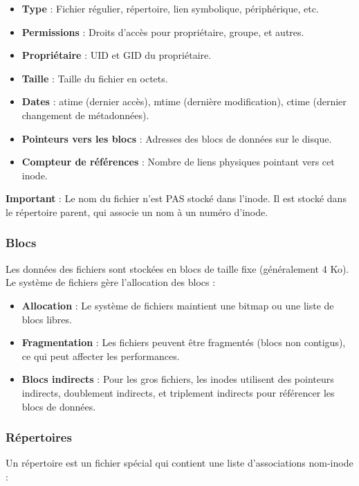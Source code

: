 \documentclass[12pt,a4paper]{article}
\begin{document}
\begin{itemize}
    \item \textbf{Type} : Fichier régulier, répertoire, lien symbolique, périphérique, etc.
    \item \textbf{Permissions} : Droits d'accès pour propriétaire, groupe, et autres.
    \item \textbf{Propriétaire} : UID et GID du propriétaire.
    \item \textbf{Taille} : Taille du fichier en octets.
    \item \textbf{Dates} : atime (dernier accès), mtime (dernière modification), ctime (dernier changement de métadonnées).
    \item \textbf{Pointeurs vers les blocs} : Adresses des blocs de données sur le disque.
    \item \textbf{Compteur de références} : Nombre de liens physiques pointant vers cet inode.
\end{itemize}

\textbf{Important} : Le nom du fichier n'est PAS stocké dans l'inode. Il est stocké dans le répertoire parent, qui associe un nom à un numéro d'inode.

\subsubsection{Blocs}

Les données des fichiers sont stockées en blocs de taille fixe (généralement 4 Ko). Le système de fichiers gère l'allocation des blocs :

\begin{itemize}
    \item \textbf{Allocation} : Le système de fichiers maintient une bitmap ou une liste de blocs libres.
    \item \textbf{Fragmentation} : Les fichiers peuvent être fragmentés (blocs non contigus), ce qui peut affecter les performances.
    \item \textbf{Blocs indirects} : Pour les gros fichiers, les inodes utilisent des pointeurs indirects, doublement indirects, et triplement indirects pour référencer les blocs de données.
\end{itemize}

\subsubsection{Répertoires}

Un répertoire est un fichier spécial qui contient une liste d'associations nom-inode :
\end{document}
